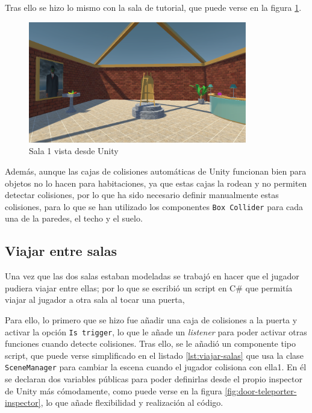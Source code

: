 Tras ello se hizo lo mismo con la sala de tutorial, que puede verse en la figura \ref{fig:unity-sala-1}.

\begin{figure}[!h]
\begin{center}
\includegraphics[width=0.85\textwidth]{imagenes/7/salas-unity/unity-sala-1.png}
\caption{Sala 1 vista desde Unity}
\label{fig:unity-sala-1}
\end{center}
\end{figure}

Además, aunque las cajas de colisiones automáticas de Unity funcionan bien para objetos no lo hacen para habitaciones, ya que estas cajas la rodean y no permiten detectar colisiones, por lo que ha sido necesario definir manualmente estas colisiones, para lo que se han utilizado los componentes \texttt{Box Collider} para cada una de la paredes, el techo y el suelo.

\subsection{Viajar entre salas}

Una vez que las dos salas estaban modeladas se trabajó en hacer que el jugador pudiera viajar entre ellas; por lo que se escribió un script en C\# que permitía viajar al jugador a otra sala al tocar una puerta, 

Para ello, lo primero que se hizo fue añadir una caja de colisiones a la puerta y activar la opción \texttt{Is trigger}, lo que le añade un \textit{listener} para poder activar otras funciones cuando detecte colisiones. Tras ello, se le añadió un componente tipo script, que puede verse simplificado en el listado \ref{lst:viajar-salas} que usa la clase \texttt{SceneManager} para cambiar la escena cuando el jugador colisiona con ella1. En él se declaran dos variables públicas para poder definirlas desde el propio inspector de Unity más cómodamente, como puede verse en la figura \ref{fig:door-teleporter-inspector}, lo que añade flexibilidad y realización al código.

